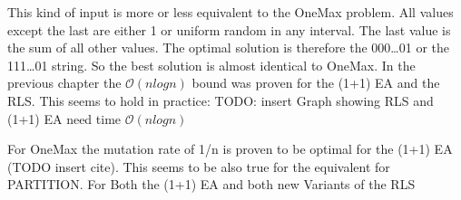 This kind of input is more or less equivalent to the OneMax problem. All values except the last are either 1 or uniform
random in any interval. The last value is the sum of all other values. The optimal solution is therefore the 000\dots01 or
the 111\dots01 string. So the best solution is almost identical to OneMax. In the previous chapter the $\mathcal{O}(nlogn)$ bound was
proven for the (1+1) EA and the RLS. This seems to hold in practice:
TODO: insert Graph showing RLS and (1+1) EA need time $\mathcal{O}(nlogn)$

For OneMax the mutation rate of 1/n is proven to be optimal for the (1+1) EA (TODO insert cite). This seems to be also
true for the equivalent for PARTITION. For Both the (1+1) EA and both new Variants of the RLS